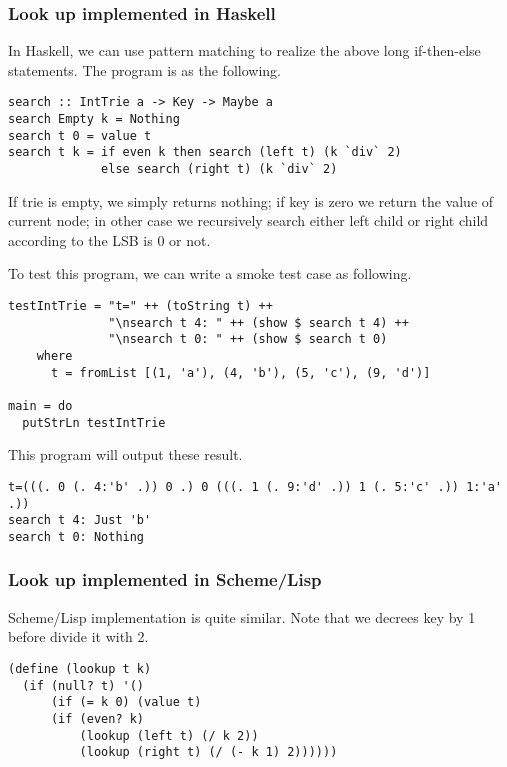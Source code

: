 \documentclass{article}
\begin{document}
\subsubsection*{Look up implemented in Haskell}
In Haskell, we can use pattern matching to realize the above long if-then-else statements.
The program is as the following.

\lstset{language=Haskell}
\begin{lstlisting}
search :: IntTrie a -> Key -> Maybe a
search Empty k = Nothing
search t 0 = value t
search t k = if even k then search (left t) (k `div` 2)
             else search (right t) (k `div` 2)
\end{lstlisting}

If trie is empty, we simply returns nothing; if key is zero we return the 
value of current node; in other case we recursively search either left
child or right child according to the LSB is 0 or not.

To test this program, we can write a smoke test case as following.

\begin{lstlisting}
testIntTrie = "t=" ++ (toString t) ++ 
              "\nsearch t 4: " ++ (show $ search t 4) ++
              "\nsearch t 0: " ++ (show $ search t 0)
    where
      t = fromList [(1, 'a'), (4, 'b'), (5, 'c'), (9, 'd')]

main = do
  putStrLn testIntTrie
\end{lstlisting}

This program will output these result.

\begin{verbatim}
t=(((. 0 (. 4:'b' .)) 0 .) 0 (((. 1 (. 9:'d' .)) 1 (. 5:'c' .)) 1:'a' .))
search t 4: Just 'b'
search t 0: Nothing
\end{verbatim}

\subsubsection*{Look up implemented in Scheme/Lisp}

Scheme/Lisp implementation is quite similar. Note that we decrees key
by 1 before divide it with 2.

\lstset{language=lisp}
\begin{lstlisting}
(define (lookup t k)
  (if (null? t) '()
      (if (= k 0) (value t)
	  (if (even? k) 
	      (lookup (left t) (/ k 2))
	      (lookup (right t) (/ (- k 1) 2))))))
\end{lstlisting}
\end{document}
